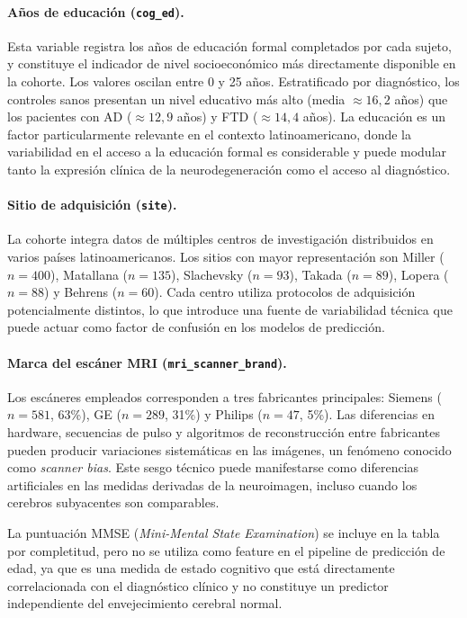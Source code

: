 \paragraph{Años de educación (\texttt{cog\_ed}).} Esta variable registra los años de educación formal completados por cada sujeto, y constituye el indicador de nivel socioeconómico más directamente disponible en la cohorte. Los valores oscilan entre 0 y 25 años. Estratificado por diagnóstico, los controles sanos presentan un nivel educativo más alto (media $\approx 16{,}2$ años) que los pacientes con AD ($\approx 12{,}9$ años) y FTD ($\approx 14{,}4$ años). La educación es un factor particularmente relevante en el contexto latinoamericano, donde la variabilidad en el acceso a la educación formal es considerable y puede modular tanto la expresión clínica de la neurodegeneración como el acceso al diagnóstico.

\paragraph{Sitio de adquisición (\texttt{site}).} La cohorte integra datos de múltiples centros de investigación distribuidos en varios países latinoamericanos. Los sitios con mayor representación son Miller ($n = 400$), Matallana ($n = 135$), Slachevsky ($n = 93$), Takada ($n = 89$), Lopera ($n = 88$) y Behrens ($n = 60$). Cada centro utiliza protocolos de adquisición potencialmente distintos, lo que introduce una fuente de variabilidad técnica que puede actuar como factor de confusión en los modelos de predicción.

\paragraph{Marca del escáner MRI (\texttt{mri\_scanner\_brand}).} Los escáneres empleados corresponden a tres fabricantes principales: Siemens ($n = 581$, 63\%), GE ($n = 289$, 31\%) y Philips ($n = 47$, 5\%). Las diferencias en hardware, secuencias de pulso y algoritmos de reconstrucción entre fabricantes pueden producir variaciones sistemáticas en las imágenes, un fenómeno conocido como \textit{scanner bias}. Este sesgo técnico puede manifestarse como diferencias artificiales en las medidas derivadas de la neuroimagen, incluso cuando los cerebros subyacentes son comparables.

La puntuación MMSE (\textit{Mini-Mental State Examination}) se incluye en la tabla por completitud, pero no se utiliza como feature en el pipeline de predicción de edad, ya que es una medida de estado cognitivo que está directamente correlacionada con el diagnóstico clínico y no constituye un predictor independiente del envejecimiento cerebral normal.

